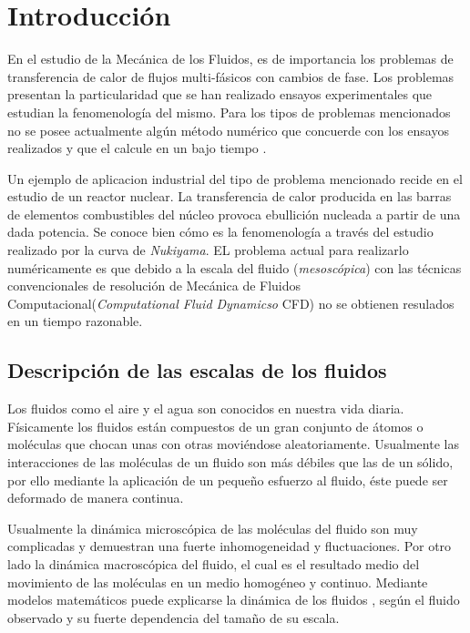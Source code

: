 \chapter{Introducción}
\graphicspath{{figs/cap1/}}
\label{cap1}


En el estudio de la Mecánica de los Fluidos, es de importancia los problemas de transferencia de calor de flujos multi-fásicos con cambios de fase. 
Los problemas presentan la particularidad que se han realizado ensayos experimentales que estudian la fenomenología del mismo.
Para los tipos de problemas mencionados no se posee actualmente algún método numérico que concuerde con los ensayos realizados y que el calcule en un bajo tiempo .

Un ejemplo de aplicacion industrial del tipo de problema mencionado recide en el estudio de un reactor nuclear.
La transferencia de calor producida en las barras de elementos combustibles del núcleo provoca ebullición nucleada a partir de una dada potencia.
Se conoce bien cómo es la fenomenología a través del estudio realizado por la curva de \textit{Nukiyama}. 
EL problema actual para realizarlo numéricamente es que debido a la escala del fluido (\textit{mesoscópica}) con las técnicas convencionales de resolución de Mecánica de Fluidos Computacional(\textit{Computational Fluid Dynamicso} CFD)
no se obtienen resulados en un tiempo razonable.

\section{Descripción de las escalas de los fluidos}

Los fluidos como el aire y el agua son conocidos en nuestra vida diaria. Físicamente los fluidos están compuestos de un gran conjunto de átomos o moléculas que chocan unas con otras moviéndose  aleatoriamente. Usualmente las interacciones de las moléculas de un fluido son más débiles que las de un sólido, por ello mediante la aplicación de un pequeño esfuerzo al fluido, éste puede ser deformado de manera continua.


Usualmente la dinámica microscópica de las moléculas del fluido son muy complicadas y demuestran una fuerte inhomogeneidad y fluctuaciones.
Por otro lado la dinámica macroscópica del fluido, el cual es el resultado medio del movimiento de las moléculas en un medio homogéneo y continuo.
Mediante modelos matemáticos puede explicarse la dinámica de los fluidos , según el fluido observado y su fuerte dependencia del tamaño de su escala.

